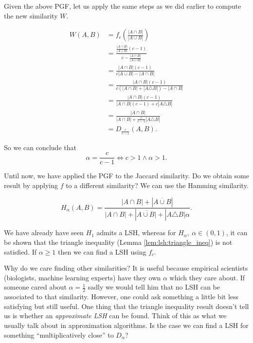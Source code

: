 Given the above PGF, let us apply the same steps as we did earlier to compute the new similarity $W$.

\begin{align}
W(A, B) &= f_c\left(\frac{|A \cap B|}{|A \cup B|}\right) \\
&= \frac{\frac{|A \cap B|}{|A \cup B|}(c-1)}{c - \frac{|A \cap B|}{|A \cup B|}}\\
& = \frac{|A \cap B|(c-1)}{c|A \cup B| - |A \cap B|}\\
& = \frac{|A \cap B|(c-1)}{c(|A \cap B| + |A \triangle B|) - |A \cap B|}\\
& = \frac{|A \cap B|(c-1)}{|A \cap B|(c-1) + c|A \triangle B|}\\
& = \frac{|A \cap B|}{|A \cap B| + \frac{c}{c-1}|A \triangle B|}\\
&= D_\frac{c}{c-1}(A, B).
\end{align}

So we can conclude that
\begin{equation}
	\alpha = \frac{c}{c-1} \Longleftrightarrow c > 1 \wedge \alpha > 1.
\end{equation}

Until now, we have applied the PGF to the Jaccard similarity. Do we obtain some result by applying $f$ to a different similarity? We can use the Hamming similarity.

\begin{equation}
	H_\alpha(A, B) = \frac{|A \cap B| + |\overline{A \cup B}|}{|A \cap B| + |\overline{A \cup B|} + | A \triangle B|\alpha}.
\end{equation}

We have already have seen $H_1$ admits a LSH, whereas for $H_\alpha,\ \alpha \in (0, 1)$, it can be shown that the triangle inequality (Lemma \ref{lem:lsh:triangle_ineq}) is not satisfied. If $\alpha \geq 1$ then we can find a LSH using $f_c$.

Why do we care finding other similarities? It is useful because empirical scientists (biologists, machine learning experts) have they own $\alpha$ which they care about. If someone cared about $\alpha = \frac{1}{2}$ sadly we would tell him that no LSH can be associated to that similarity. However, one could ask something a little bit less satisfying but still useful. One thing that the triangle inequality result doesn't tell us is whether an \emph{approximate LSH} can be found. Think of this as what we usually talk about in approximation algorithms. Is the case we can find a LSH for something ``multiplicatively close'' to $D_\alpha$?

